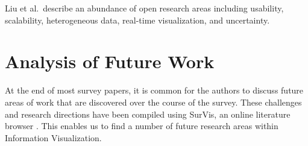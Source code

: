 
Liu et al.\ describe an abundance of open research areas including usability, scalability, heterogeneous data, real-time visualization, and uncertainty.










\section{Analysis of Future Work}
At the end of most survey papers, it is common for the authors to discuss future areas of work that are discovered over the course of the survey. These challenges and research directions have been compiled using SurVis, an online literature browser \cite{beck2016visual,surVis}. This enables us to find a number of future research areas within Information Visualization.

